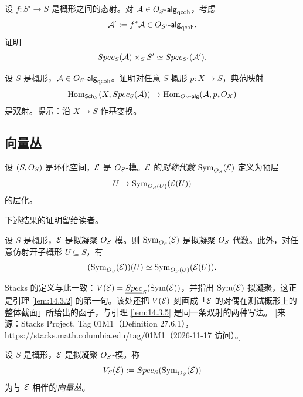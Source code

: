 \begin{exercise}\label{exc:14.2.6}
设 $f\colon S'\to S$ 是概形之间的态射。对 $\mathcal{A}\in O_S\text{-}\mathsf{alg}_{\mathrm{qcoh}}$，考虑
\[
\mathcal{A}':=f^*\mathcal{A}\in O_{S'}\text{-}\mathsf{alg}_{\mathrm{qcoh}}.
\]
证明
\[
Spec_S(\mathcal{A})\times_SS'\simeq Spec_{S'}(\mathcal{A}').
\]
\end{exercise}

\begin{exercise}\label{exc:14.2.7}
设 $S$ 是概形，$\mathcal{A}\in O_S\text{-}\mathsf{alg}_{\mathrm{qcoh}}$。证明对任意 $S$-概形 $p\colon X\to S$，典范映射
\[
\operatorname{Hom}_{\mathsf{Sch}_S}(X,Spec_S(\mathcal{A}))\to\operatorname{Hom}_{O_S\text{-}\mathsf{alg}}(\mathcal{A},p_*O_X)
\]
是双射。提示：沿 $X\to S$ 作基变换。
\end{exercise}

\subsection{向量丛}\label{sec:14.3}

\begin{construction}\label{con:14.3.1}
设 $(S,O_S)$ 是环化空间，$\mathcal{E}$ 是 $O_S$-模。$\mathcal{E}$ 的\emph{对称代数} $\mathrm{Sym}_{O_S}(\mathcal{E})$ 定义为预层
\[
U\mapsto\mathrm{Sym}_{O_S(U)}(\mathcal{E}(U))
\]
的层化。
\end{construction}

下述结果的证明留给读者。

\begin{lemma}\label{lem:14.3.2}
设 $S$ 是概形，$\mathcal{E}$ 是拟凝聚 $O_S$-模。则 $\mathrm{Sym}_{O_S}(\mathcal{E})$ 是拟凝聚 $O_S$-代数。此外，对任意仿射开子概形 $U\subseteq S$，有
\[
(\mathrm{Sym}_{O_S}(\mathcal{E}))(U)\simeq\mathrm{Sym}_{O_S(U)}(\mathcal{E}(U)).
\]
\end{lemma}

\begin{yizhu}
Stacks 的定义与此一致：$V(\mathcal{E})=\underline{Spec}_S(\mathrm{Sym}(\mathcal{E}))$，并指出 $\mathrm{Sym}(\mathcal{E})$ 拟凝聚，这正是引理 \ref{lem:14.3.2} 的第一句。该处还把 $V(\mathcal{E})$ 刻画成「$\mathcal{E}$ 的对偶在测试概形上的整体截面」所给出的函子，与引理 \ref{lem:14.3.5} 是同一条双射的两种写法。
[来源：Stacks Project, Tag 01M1（Definition 27.6.1），\url{https://stacks.math.columbia.edu/tag/01M1}（2026-11-17 访问）。]
\end{yizhu}

\begin{construction}\label{con:14.3.3}
设 $S$ 是概形，$\mathcal{E}$ 是拟凝聚 $O_S$-模。称
\[
V_S(\mathcal{E}):=Spec_S(\mathrm{Sym}_{O_S}(\mathcal{E}))
\]
为与 $\mathcal{E}$ 相伴的\emph{向量丛}。
\end{construction}

